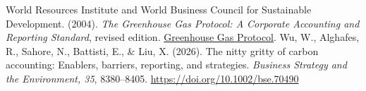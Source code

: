 \begin{thebibliography}{}
 World Resources Institute and World Business Council for Sustainable Development. (2004). \emph{The Greenhouse Gas Protocol: A Corporate Accounting and Reporting Standard}, revised edition. \href{https://ghgprotocol.org/sites/default/files/standards/ghg-protocol-revised.pdf}{Greenhouse Gas Protocol}.
 Wu, W., Alghafes, R., Sahore, N., Battisti, E., \& Liu, X. (2026). The nitty gritty of carbon accounting: Enablers, barriers, reporting, and strategies. \emph{Business Strategy and the Environment, 35}, 8380--8405. \url{https://doi.org/10.1002/bse.70490}
\end{thebibliography}
